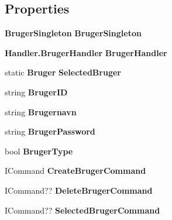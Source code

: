\subsection*{Properties}
\begin{DoxyCompactItemize}
\item 
\mbox{\label{class_r_f_storage_1_1_view_model_1_1_create_remove_bruger_v_m_a59f6452153176e1025080cddbf760b58}} 
\textbf{ Bruger\+Singleton} {\bfseries Bruger\+Singleton}\hspace{0.3cm}{\ttfamily  [get, set]}
\item 
\mbox{\label{class_r_f_storage_1_1_view_model_1_1_create_remove_bruger_v_m_aa11323d96f4bd8736f4e376270d517d1}} 
\textbf{ Handler.\+Bruger\+Handler} {\bfseries Bruger\+Handler}\hspace{0.3cm}{\ttfamily  [get, set]}
\item 
\mbox{\label{class_r_f_storage_1_1_view_model_1_1_create_remove_bruger_v_m_a5f5420422f97d13f25e6ac680569efd7}} 
static \textbf{ Bruger} {\bfseries Selected\+Bruger}\hspace{0.3cm}{\ttfamily  [get, set]}
\item 
\mbox{\label{class_r_f_storage_1_1_view_model_1_1_create_remove_bruger_v_m_a780743972633c5070b416aeb7487cdd6}} 
string {\bfseries Bruger\+ID}\hspace{0.3cm}{\ttfamily  [get, set]}
\item 
\mbox{\label{class_r_f_storage_1_1_view_model_1_1_create_remove_bruger_v_m_a929998df37b3055b2e90570cb38b98bc}} 
string {\bfseries Brugernavn}\hspace{0.3cm}{\ttfamily  [get, set]}
\item 
\mbox{\label{class_r_f_storage_1_1_view_model_1_1_create_remove_bruger_v_m_a7b392ecf6b1740eaf5529b6aae14f7e4}} 
string {\bfseries Bruger\+Password}\hspace{0.3cm}{\ttfamily  [get, set]}
\item 
\mbox{\label{class_r_f_storage_1_1_view_model_1_1_create_remove_bruger_v_m_a97913bb66d47bce5a6decc658ce501ac}} 
bool {\bfseries Bruger\+Type}\hspace{0.3cm}{\ttfamily  [get, set]}
\item 
\mbox{\label{class_r_f_storage_1_1_view_model_1_1_create_remove_bruger_v_m_a954f513b01a1be15dcd08467fa4650bb}} 
I\+Command {\bfseries Create\+Bruger\+Command}\hspace{0.3cm}{\ttfamily  [get, set]}
\item 
\mbox{\label{class_r_f_storage_1_1_view_model_1_1_create_remove_bruger_v_m_a18e2f46d7a56841db693ffa90d88676d}} 
I\+Command?? {\bfseries Delete\+Bruger\+Command}\hspace{0.3cm}{\ttfamily  [get, set]}
\item 
\mbox{\label{class_r_f_storage_1_1_view_model_1_1_create_remove_bruger_v_m_a2b2aa0234ac8cdc89a5ec020045cc911}} 
I\+Command?? {\bfseries Selected\+Bruger\+Command}\hspace{0.3cm}{\ttfamily  [get, set]}
\end{DoxyCompactItemize}
